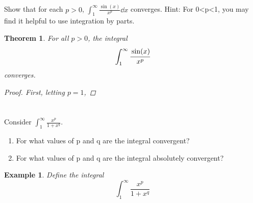 \documentclass[]{article}
\newtheorem{theorem}{Theorem}
\newtheorem{example}{Example}
\begin{document}


\newpage
\section{}
Show that for each $p > 0$, $\int_{1}^{\infty} \frac{\sin(x)}{x^p} \dd{x}$ converges.
Hint: For 0<p<1, you may find it helpful to use integration by parts.

\begin{theorem}
    For all $p>0$, the integral \[
        \int_{1}^{\infty} \cfrac{\sin(x)}{x^p}
    \] converges.
    \begin{proof}
        First, letting $p = 1$, 
    \end{proof}
\end{theorem}










\newpage
\section{}
Consider $\int_{1}^{\infty} \frac{x^p}{1 + x^q}$.
\begin{enumerate}
    \item For what values of p and q are the integral convergent?
    \item For what values of p and q are the integral absolutely convergent?
\end{enumerate}

\begin{example}
    Define the integral\[
        \int_{1}^{\infty} \frac{x^p}{1 + x^q}
    \]

\end{example}
\end{document}
